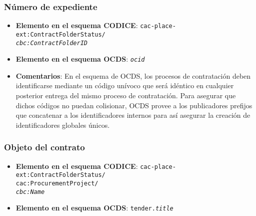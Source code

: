         \subsubsection{Número de expediente}
            \begin{itemize}
                \item \textbf{Elemento en el esquema CODICE}:
                    \tabto{7.6cm} \texttt{cac-place-ext:ContractFolderStatus/} \\
                    \tabto{7.6cm} \texttt{\textit{cbc:ContractFolderID}}
                \item \textbf{Elemento en el esquema OCDS}:
                    \tabto{7.6cm} \texttt{\textit{ocid}}
                \item \textbf{Comentarios}: En el esquema de OCDS, los procesos de contratación deben identificarse mediante un código unívoco que será idéntico en cualquier posterior entrega del mismo proceso de contratación. Para asegurar que dichos códigos no puedan colisionar, OCDS provee a los publicadores prefijos que concatenar a los identificadores internos para así asegurar la creación de identificadores globales únicos.
            \end{itemize}
        
        \subsubsection{Objeto del contrato}
            \begin{itemize}
                \item \textbf{Elemento en el esquema CODICE}:
                    \tabto{7.6cm} \texttt{cac-place-ext:ContractFolderStatus/} \\
                    \tabto{7.6cm} \texttt{cac:ProcurementProject/} \\
                    \tabto{7.6cm} \texttt{\textit{cbc:Name}}
                \item \textbf{Elemento en el esquema OCDS}:
                    \tabto{7.6cm} \texttt{tender.\textit{title}}
            \end{itemize}
        
